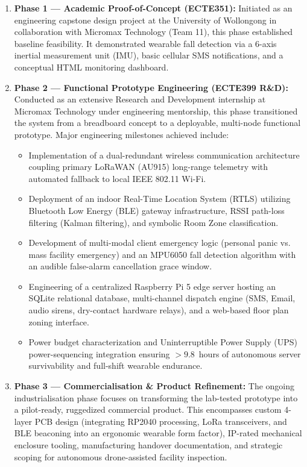 \begin{enumerate}
    \item \textbf{Phase 1 --- Academic Proof-of-Concept (ECTE351):} Initiated as an engineering capstone design project at the University of Wollongong in collaboration with Micromax Technology (Team 11), this phase established baseline feasibility. It demonstrated wearable fall detection via a 6-axis inertial measurement unit (IMU), basic cellular SMS notifications, and a conceptual HTML monitoring dashboard.
    \item \textbf{Phase 2 --- Functional Prototype Engineering (ECTE399 R\&D):} Conducted as an extensive Research and Development internship at Micromax Technology under engineering mentorship, this phase transitioned the system from a breadboard concept to a deployable, multi-node functional prototype. Major engineering milestones achieved include:
    \begin{itemize}
        \item Implementation of a dual-redundant wireless communication architecture coupling primary LoRaWAN (AU915) long-range telemetry with automated fallback to local IEEE 802.11 Wi-Fi.
        \item Deployment of an indoor Real-Time Location System (RTLS) utilizing Bluetooth Low Energy (BLE) gateway infrastructure, RSSI path-loss filtering (Kalman filtering), and symbolic Room Zone classification.
        \item Development of multi-modal client emergency logic (personal panic vs. mass facility emergency) and an MPU6050 fall detection algorithm with an audible false-alarm cancellation grace window.
        \item Engineering of a centralized Raspberry Pi 5 edge server hosting an SQLite relational database, multi-channel dispatch engine (SMS, Email, audio sirens, dry-contact hardware relays), and a web-based floor plan zoning interface.
        \item Power budget characterization and Uninterruptible Power Supply (UPS) power-sequencing integration ensuring $>9.8$~hours of autonomous server survivability and full-shift wearable endurance.
    \end{itemize}
    \item \textbf{Phase 3 --- Commercialisation \& Product Refinement:} The ongoing industrialisation phase focuses on transforming the lab-tested prototype into a pilot-ready, ruggedized commercial product. This encompasses custom 4-layer PCB design (integrating RP2040 processing, LoRa transceivers, and BLE beaconing into an ergonomic wearable form factor), IP-rated mechanical enclosure tooling, manufacturing handover documentation, and strategic scoping for autonomous drone-assisted facility inspection.
\end{enumerate}


